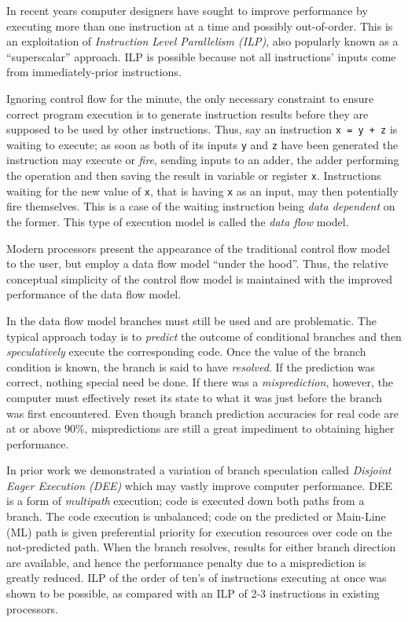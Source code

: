 \documentclass[10pt,dvips]{article}
\begin{document}
In recent years computer designers have sought to improve performance by
executing more than one instruction at a time and possibly out-of-order. This is
an exploitation of {\it Instruction Level Parallelism (ILP)}, also popularly known
as a ``superscalar'' approach. ILP is possible because not all instructions' inputs
come from immediately-prior instructions.

Ignoring control flow for the minute, the
only necessary constraint to ensure correct program execution is to generate instruction
results before they are supposed to be used by other instructions. Thus, say an
instruction {\tt x = y + z} is waiting to execute; as soon as both of its inputs
{\tt y} and {\tt z} have been generated the instruction may execute or {\it fire},
sending inputs to an adder, the adder performing the operation and then saving
the result in variable or register {\tt x}. Instructions waiting for the new value
of {\tt x}, that is having {\tt x} as an input, may then potentially fire themselves.
This is a case of the waiting instruction being {\it data dependent} on the former.
This type of execution model is called the {\it data flow} model.

Modern processors present the appearance of the traditional control flow model to
the user, but employ a data flow model ``under the hood''. Thus, the relative
conceptual
simplicity of the control flow model is maintained with the improved performance of
the data flow model.

In the data flow model branches must still be used and are problematic. The typical
approach today is to {\it predict} the outcome of conditional branches and then
{\it speculatively} execute the corresponding code. Once the value of the
branch condition is known, the branch is said to have {\it resolved}. If the
prediction was correct, nothing special need be done. If there was a
{\it misprediction}, however, the computer must effectively reset its state to
what it was just before the branch was first encountered. Even though
branch prediction accuracies for real code are at or above 90\%, mispredictions
are still a great impediment to obtaining higher performance.

In prior work\cite{Uht95} we demonstrated a variation of branch speculation called
{\it Disjoint Eager Execution (DEE)} which may vastly improve computer performance.
DEE is a form of {\it multipath} execution; code is executed down both paths from
a branch. The code execution is unbalanced; code on the predicted or Main-Line (ML)
path is given
preferential priority for execution resources over code on the not-predicted path.
When the branch resolves, results for either branch direction are available,
and hence the performance penalty due to a misprediction is greatly reduced.
ILP of the order of ten's of instructions executing at once was shown to be
possible, as compared with an ILP of 2-3 instructions in existing processors.
\end{document}
